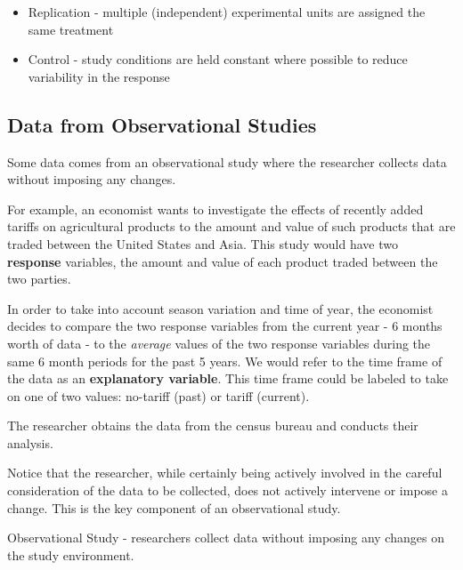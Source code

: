 \documentclass[
]{book}
\providecommand{\tightlist}{%
  \setlength{\itemsep}{0pt}\setlength{\parskip}{0pt}}
\theoremstyle{definition}
\theoremstyle{definition}
\theoremstyle{definition}
\theoremstyle{remark}
\let\BeginKnitrBlock\begin \let\EndKnitrBlock\end
\begin{document}
\BeginKnitrBlock{definition}
\begin{itemize}
\tightlist
\item
  Replication - multiple (independent) experimental units are assigned the same treatment\\
\end{itemize}
\EndKnitrBlock{definition}

\BeginKnitrBlock{definition}
\begin{itemize}
\tightlist
\item
  Control - study conditions are held constant where possible to reduce variability in the response\\
\end{itemize}
\EndKnitrBlock{definition}

\hypertarget{data-from-observational-studies}{%
\subsection{Data from Observational Studies}\label{data-from-observational-studies}}

Some data comes from an observational study where the researcher collects data without imposing any changes.

For example, an economist wants to investigate the effects of recently added tariffs on agricultural products to the amount and value of such products that are traded between the United States and Asia. This study would have two \textbf{response} variables, the amount and value of each product traded between the two parties.

In order to take into account season variation and time of year, the economist decides to compare the two response variables from the current year - 6 months worth of data - to the \emph{average} values of the two response variables during the same 6 month periods for the past 5 years. We would refer to the time frame of the data as an \textbf{explanatory variable}. This time frame could be labeled to take on one of two values: no-tariff (past) or tariff (current).

The researcher obtains the data from the census bureau and conducts their analysis.

Notice that the researcher, while certainly being actively involved in the careful consideration of the data to be collected, does not actively intervene or impose a change. This is the key component of an observational study.

\BeginKnitrBlock{definition}
Observational Study - researchers collect data without imposing any changes on the study environment.
\EndKnitrBlock{definition}
\end{document}
